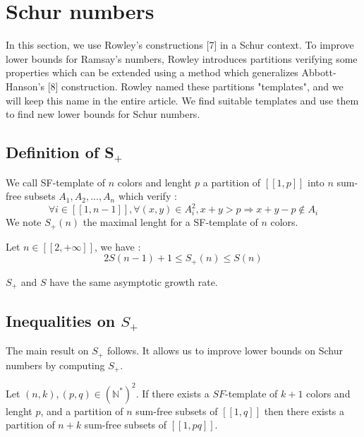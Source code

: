 \section{Schur numbers}

\qquad In this section, we use Rowley's constructions [7] in a Schur context. To improve lower bounds for Ramsay's numbers, Rowley 
introduces partitions verifying some properties which can be extended using a method which generalizes Abbott-Hanson's [8] construction. 
Rowley named these partitions "templates", and we will keep this name in the entire article. We find suitable templates and use them
 to find new lower bounds for Schur numbers.

\subsection{Definition of S\(_+\)}

\begin{definition}
	We call SF-template of \(n\) colors and lenght \(p\) a partition of \( [\![1,p]\!]\) into \(n\) sum-free subsets \(A_1, A_2, ..., A_n\) which verify :
	\[
	\forall i \in [\![1, n-1]\!], \forall (x,y) \in A_i^2, x+y > p
	\Longrightarrow x+y-p \notin A_i
	\]
	We note \(S_+(n)\) the maximal lenght for a SF-template of \(n\) colors. 
\end{definition}

\begin{theorem}
	Let \(n \in [\![2, +\infty]\!]\), we have :
	\[
	2S(n-1)+1 \leqslant S_+(n) \leqslant S(n)
	\]
\end{theorem}

\begin{remark}
	\(S_+\) and \(S\) have the same asymptotic growth rate.
\end{remark}


\subsection{Inequalities on \(S_+\)} 

The main result on \(S_+\) follows. It allows us to improve lower bounds on Schur numbers by computing \(S_+\).

\begin{theorem}
	Let $(n,k), (p,q) \in (\mathbb{N}^*)^2$. If there exists a \(SF\)-template of $k+1$ colors and lenght \(p\),
	and a partition of $n$ sum-free subsets of $[\![1,q]\!]$ then there exists a partition of $n+k$ sum-free subsets of $[\![1,pq]\!]$.
\end{theorem}

